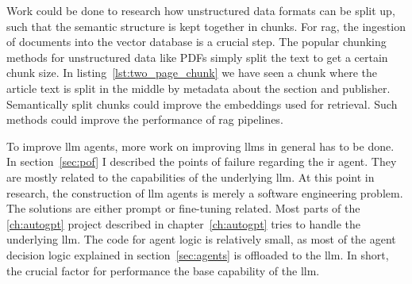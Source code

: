 \documentclass[../main.tex]{subfiles}
\begin{document}
Work could be done to research how unstructured data formats can be split up,
such that the semantic structure is kept together in chunks.
For \gls{rag}, the ingestion of documents into the vector database is a crucial step.
The popular chunking methods for unstructured data like PDFs simply split the text to get a certain chunk size.
In listing~\ref{lst:two_page_chunk} we have seen a chunk where the article text is split in the middle
by metadata about the section and publisher.
Semantically split chunks could improve the embeddings used for retrieval.
Such methods could improve the performance of \gls{rag} pipelines.

To improve \gls{llm} agents, more work on improving \glspl{llm} in
general has to be done.
In section~\ref{sec:pof} I described the points of failure regarding the \gls{ir} agent.
They are mostly related to the capabilities of the underlying \gls{llm}.
At this point in research,
the construction of \gls{llm} agents is merely a software engineering problem.
The solutions are either prompt or fine-tuning related.
Most parts of the \ref{ch:autogpt} project described in chapter~\ref{ch:autogpt} tries
to handle the underlying \gls{llm}.
The code for agent logic is relatively small, as most of the agent decision logic
explained in section~\ref{sec:agents} is offloaded to the \gls{llm}.
In short, the crucial factor for performance the base capability of the \gls{llm}.
\end{document}
